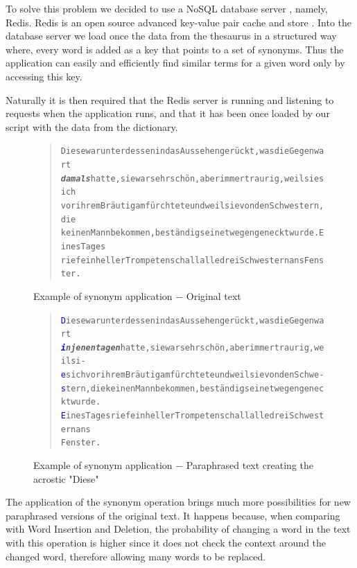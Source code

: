 \documentclass[11pt]{reportAlternative}
\begin{document}
To solve this problem we decided to use a NoSQL database server \cite{NoSQL}, namely, Redis. Redis is an open source advanced key-value pair cache and store \cite{Redis}. Into the database server we load once the data from the thesaurus in a structured way where, every word is added as a key that points to a set of synonyms. Thus the application can easily and efficiently find similar terms for a given word only by accessing this key.

Naturally it is then required that the Redis server is running and listening to requests when the application runs, and that it has been once loaded by our script with the data from the dictionary.

\begin{figure}[H]
\begin{quote}
\begin{alltt}
Diese war unterdessen in das Aussehen gerückt, was die Gegenwart
\emph{\textbf{damals}} hatte, sie war sehr schön, aber immer traurig, weil sie sich
vor ihrem Bräutigam fürchtete und weil sie von den Schwestern, die
keinen Mann bekommen, beständig seinetwegen geneckt wurde. Eines Tages
rief ein heller Trompetenschall alle drei Schwestern ans Fenster.
\end{alltt}
\end{quote}
\caption{Example of synonym application $-$ Original text}
\end{figure}

\begin{figure}[H]
\begin{quote}
\begin{alltt}
\textcolor{Blue}{D}iese war unterdessen in das Aussehen gerückt, was die Gegenwart
\emph{\textbf{\textcolor{Blue}{i}n jenen tagen}} hatte, sie war sehr schön, aber immer traurig, weil si-
\textcolor{Blue}{e} sich vor ihrem Bräutigam fürchtete und weil sie von den Schwe-
\textcolor{Blue}{s}tern, die keinen Mann bekommen, beständig seinetwegen geneckt wurde.
\textcolor{Blue}{E}ines Tages rief ein heller Trompetenschall alle drei Schwestern ans
Fenster.
\end{alltt}
\end{quote}
\caption{Example of synonym application $-$ Paraphrased text creating the acrostic "Diese"\label{fig:SynonymResult}}
\end{figure}

The application of the synonym operation brings much more possibilities for new paraphrased versions of the original text. It happens because, when comparing with Word Insertion and Deletion, the probability of changing a word in the text with this operation is higher since it does not check the context around the changed word, therefore allowing many words to be replaced.
\end{document}
